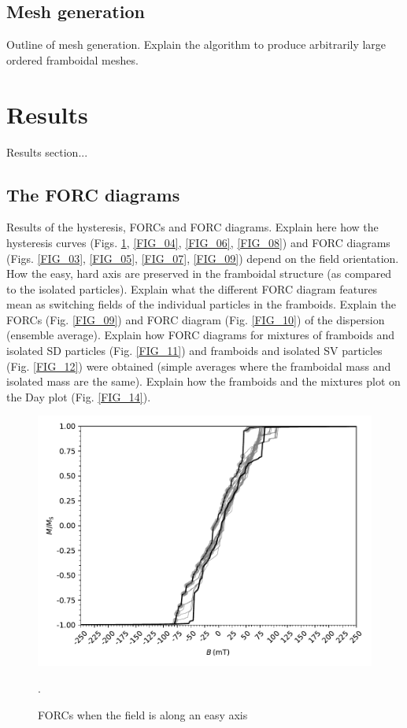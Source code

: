 \subsection{Mesh generation}
Outline of mesh generation. Explain the algorithm to produce arbitrarily large ordered framboidal meshes.\par

\section{Results}
Results section...\par

\subsection{The FORC diagrams}
Results of the hysteresis, FORCs and FORC diagrams. Explain here how the hysteresis curves (Figs. \ref{FIG_02}, \ref{FIG_04}, \ref{FIG_06}, \ref{FIG_08}) and FORC diagrams (Figs. \ref{FIG_03}, \ref{FIG_05}, \ref{FIG_07}, \ref{FIG_09}) depend on the field orientation. How the easy, hard axis are preserved in the framboidal structure (as compared to the isolated particles). Explain what the different FORC diagram features mean as switching fields of the individual particles in the framboids. Explain the FORCs (Fig. \ref{FIG_09}) and FORC diagram (Fig. \ref{FIG_10}) of the dispersion (ensemble average). Explain how FORC diagrams for mixtures of framboids and isolated SD particles (Fig. \ref{FIG_11}) and framboids and isolated SV particles (Fig. \ref{FIG_12}) were obtained (simple averages where the framboidal mass and isolated mass are the same). Explain how the framboids and the mixtures plot on the Day plot (Fig. \ref{FIG_14}).\par
\begin{figure}
\centering
\includegraphics[width=\textwidth]{research-4/figs/BM21_withFORCS.pdf}
\caption[FORCs when the field is along an easy axis]{FORCs when the field is along an easy axis}.
\label{FIG_02}
\end{figure}

